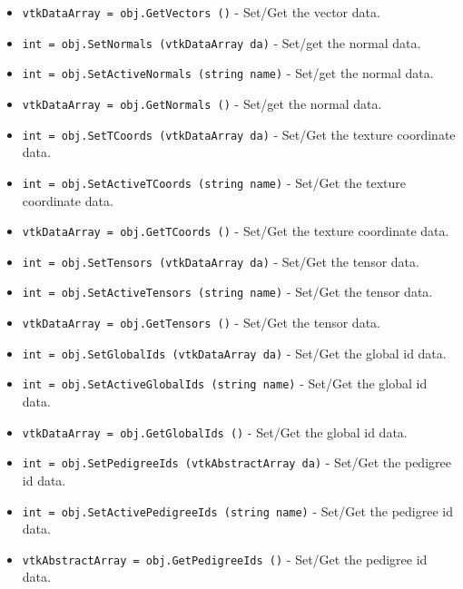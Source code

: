 \begin{itemize}
\item  \verb|vtkDataArray = obj.GetVectors ()| -  Set/Get the vector data.

\item  \verb|int = obj.SetNormals (vtkDataArray da)| -  Set/get the normal data.

\item  \verb|int = obj.SetActiveNormals (string name)| -  Set/get the normal data.

\item  \verb|vtkDataArray = obj.GetNormals ()| -  Set/get the normal data.

\item  \verb|int = obj.SetTCoords (vtkDataArray da)| -  Set/Get the texture coordinate data.

\item  \verb|int = obj.SetActiveTCoords (string name)| -  Set/Get the texture coordinate data.

\item  \verb|vtkDataArray = obj.GetTCoords ()| -  Set/Get the texture coordinate data.

\item  \verb|int = obj.SetTensors (vtkDataArray da)| -  Set/Get the tensor data.

\item  \verb|int = obj.SetActiveTensors (string name)| -  Set/Get the tensor data.

\item  \verb|vtkDataArray = obj.GetTensors ()| -  Set/Get the tensor data.

\item  \verb|int = obj.SetGlobalIds (vtkDataArray da)| -  Set/Get the global id data.

\item  \verb|int = obj.SetActiveGlobalIds (string name)| -  Set/Get the global id data.

\item  \verb|vtkDataArray = obj.GetGlobalIds ()| -  Set/Get the global id data.

\item  \verb|int = obj.SetPedigreeIds (vtkAbstractArray da)| -  Set/Get the pedigree id data.

\item  \verb|int = obj.SetActivePedigreeIds (string name)| -  Set/Get the pedigree id data.

\item  \verb|vtkAbstractArray = obj.GetPedigreeIds ()| -  Set/Get the pedigree id data.


\end{itemize}
